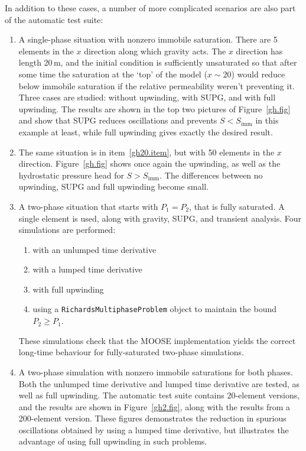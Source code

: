 \documentclass[]{scrreprt}
\begin{document}
\noindent In addition to these cases, a number of more complicated scenarios are
also part of the automatic test suite:
\begin{enumerate}
\item\label{gh20.item} A single-phase situation with nonzero immobile
  saturation.  There are 5 elements in the $x$ direction along which
  gravity acts.  The $x$ direction has length 20\,m, and the initial
  condition is sufficiently unsaturated so that after some time the
  saturation at the `top' of the model ($x\sim 20$) would reduce below
  immobile saturation if the relative permeability weren't preventing
  it.  Three cases are studied: without upwinding, with SUPG, and with
  full upwinding.  The results are shown in the top two pictures of
  Figure~\ref{gh.fig} and show that SUPG reduces oscillations and
  prevents $S<S_{\mathrm{imm}}$ in this example at least, while full
  upwinding gives exactly the desired result.
\item The same situation is in item~\ref{gh20.item}, but with 50
  elements in the $x$ direction.  Figure~\ref{gh.fig} shows once again
  the upwinding, as well as the hydrostatic
  pressure head for $S>S_{\mathrm{imm}}$.  The differences between no
  upwinding, SUPG and full upwinding become small.
\item A two-phase situation that starts with $P_{1}=P_{2}$, that is
  fully saturated.  A single element is used, along with gravity,
  SUPG, and transient analysis.  Four simulations are performed:
\begin{enumerate}
\item with an unlumped time derivative
\item with a lumped time derivative
\item with full upwinding
\item using a {\tt RichardsMultiphaseProblem} object to maintain the
  bound $P_{2}\geq P_{1}$.
\end{enumerate}
These simulations check that the MOOSE
  implementation yields the correct long-time behaviour for
  fully-saturated two-phase simulations.
\item A two-phase simulation with nonzero immobile saturations for
  both phases.  Both the unlumped time derivative and lumped time
  derivative are tested, as well as full upwinding.  The automatic
  test suite contains 20-element versions, and the results are shown
  in Figure~\ref{gh2.fig}, along with the results from a 200-element
  version.  These figures demonstrates the reduction in spurious
  oscillations obtained by using a lumped time derivative, but
  illustrates the advantage of using full upwinding in such problems.
\end{enumerate}
\end{document}
